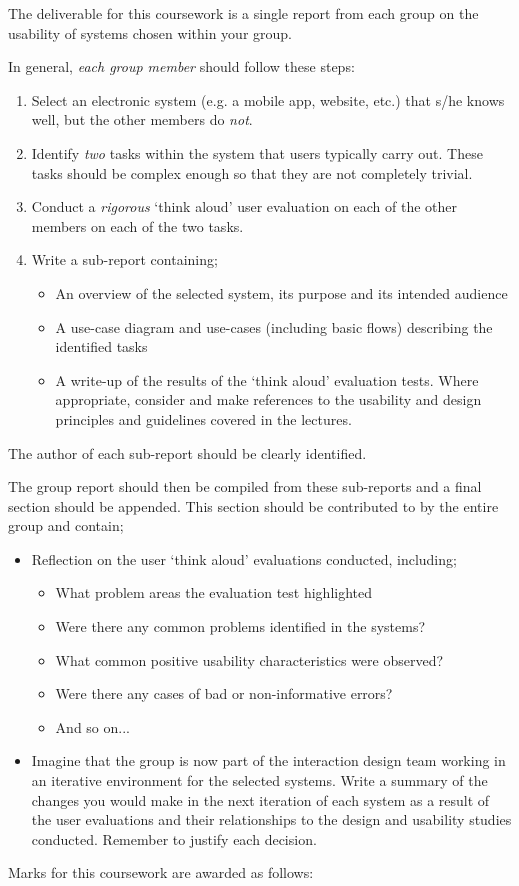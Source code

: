 \documentclass[11pt,a4paper]{report}
\begin{document}
The deliverable for this coursework is a single report from each group on the usability of systems chosen within your group.

In general, \textit{each group member} should follow these steps:
\begin{enumerate}
    \item Select an electronic system (e.g. a mobile app, website, etc.) that s/he knows well, but the other members do \textit{not}.
    \item Identify \textit{two} tasks within the system that users typically carry out. These tasks should be complex enough so that they are not completely trivial.
    \item Conduct a \textit{rigorous} `think aloud' user evaluation on each of the other members on each of the two tasks.
    \item Write a sub-report containing;
    \begin{itemize}
        \item An overview of the selected system, its purpose and its intended audience
        \item A use-case diagram and use-cases (including basic flows) describing the identified tasks 
        \item A write-up of the results of the `think aloud' evaluation tests. Where appropriate, consider and make references to the usability and design principles and guidelines covered in the lectures. 
    \end{itemize}
\end{enumerate} 
The author of each sub-report should be clearly identified.

The group report should then be compiled from these sub-reports and a final section should be appended. This section should be contributed to by the entire group and contain;
\begin{itemize}
    \item Reflection on the user `think aloud' evaluations conducted, including;
    \begin{itemize}
        \item What problem areas the evaluation test highlighted 
        \item Were there any common problems identified in the systems?
        \item What common positive usability characteristics were observed?
        \item Were there any cases of bad or non-informative errors?
        \item And so on... 
    \end{itemize}
    \item Imagine that the group is now part of the interaction design team working in an iterative environment for the selected systems. Write a summary of the changes you would make in the next iteration of each system as a result of the user evaluations and their relationships to the design and usability studies conducted. Remember to justify each decision. 
\end{itemize}
Marks for this coursework are awarded as follows:
\end{document}
